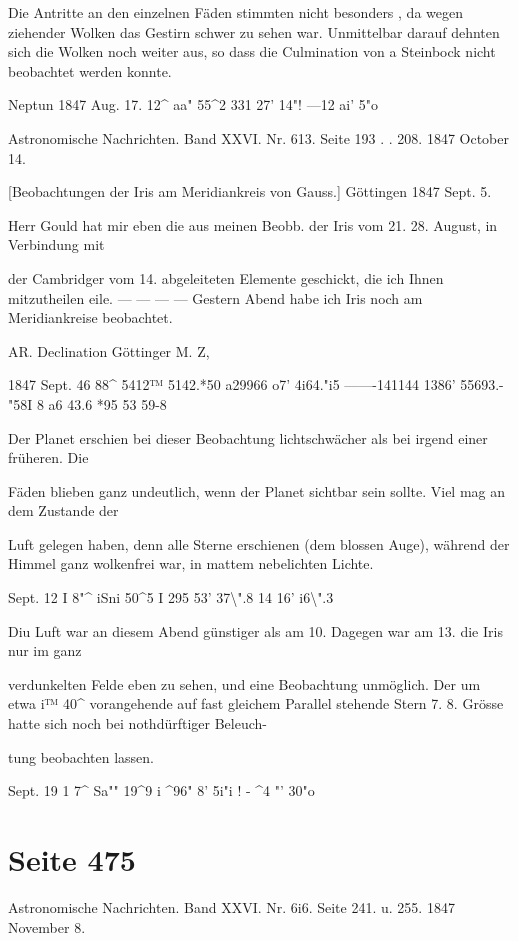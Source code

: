 \documentclass[10pt,a4paper]{article}
\begin{document}
Die Antritte an den einzelnen Fäden stimmten nicht besonders , da wegen ziehender Wolken das Gestirn schwer zu sehen war. Unmittelbar darauf dehnten sich die Wolken noch weiter aus, so dass die Culmination von a Steinbock nicht beobachtet werden konnte.

Neptun 1847 Aug. 17. 12\textasciicircum{} aa" 55\textasciicircum{}2 331\textdegree{} 27' 14"! —12\textdegree{} ai' 5"o

Astronomische Nachrichten. Band XXVI. Nr. 613. Seite 193 . . 208. 1847 October 14.

[Beobachtungen der Iris am Meridiankreis von Gauss.] Göttingen 1847 Sept. 5.

Herr Gould hat mir eben die aus meinen Beobb. der Iris vom 21. 28. August, in Verbindung mit

der Cambridger vom 14. abgeleiteten Elemente geschickt, die ich Ihnen mitzutheilen eile. — — — — Gestern Abend habe ich Iris noch am Meridiankreise beobachtet.

AR. Declination Göttinger M. Z,

1847 Sept. 46 88\textasciicircum{} 5412™ 5142.*50 a29966\textdegree{} o7' 4i64."i5 ——-14\textdegree{}1144 1386' 55693.-"58I 8 a6 43.6 *95 53 59-8

Der Planet erschien bei dieser Beobachtung lichtschwächer als bei irgend einer früheren. Die

Fäden blieben ganz undeutlich, wenn der Planet sichtbar sein sollte. Viel mag an dem Zustande der

Luft gelegen haben, denn alle Sterne erschienen (dem blossen Auge), während der Himmel ganz wolkenfrei war, in mattem nebelichten Lichte.

Sept. 12 I 8"\textasciicircum{} iSni 50\textasciicircum{}5 I 295\textdegree{} 53' 37\textbackslash{}".8 14\textdegree{} 16' i6\textbackslash{}".3

Diu Luft war an diesem Abend günstiger als am 10. Dagegen war am 13. die Iris nur im ganz

verdunkelten Felde eben zu sehen, und eine Beobachtung unmöglich. Der um etwa i™ 40\textasciicircum{} vorangehende auf fast gleichem Parallel stehende Stern 7. 8. Grösse hatte sich noch bei nothdürftiger Beleuch-

tung beobachten lassen.

Sept. 19 1 7\textasciicircum{} Sa"" 19\textasciicircum{}9 i \textasciicircum{}96" 8' 5i"i ! - \textasciicircum{}4\textdegree{} "' 30"o


\newpage
\section*{Seite 475}
Astronomische Nachrichten. Band XXVI. Nr. 6i6. Seite 241. u. 255. 1847 November 8.
\end{document}
